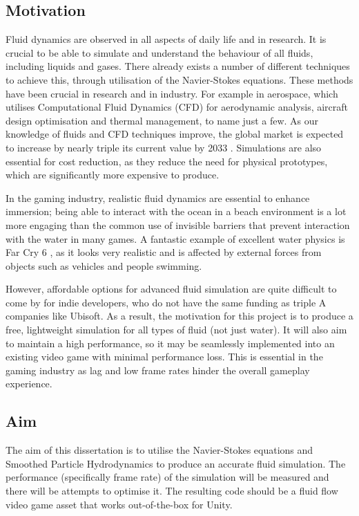 \documentclass[12pt]{article}
\begin{document}
    \subsection{Motivation}
    Fluid dynamics are observed in all aspects of daily life and in research. It is crucial to be able to simulate and understand the behaviour of all fluids, including liquids and gases. There already exists a number of different techniques to achieve this, through utilisation of the Navier-Stokes equations. These methods have been crucial in research and in industry. For example in aerospace, which utilises Computational Fluid Dynamics (CFD) for aerodynamic analysis, aircraft design optimisation and thermal management, to name just a few. As our knowledge of fluids and CFD techniques improve, the global market is expected to increase by nearly triple its current value by 2033 \cite{market}. Simulations are also essential for cost reduction, as they reduce the need for physical prototypes, which are significantly more expensive to produce.

    In the gaming industry, realistic fluid dynamics are essential to enhance immersion; being able to interact with the ocean in a beach environment is a lot more engaging than the common use of invisible barriers that prevent interaction with the water in many games. A fantastic example of excellent water physics is Far Cry 6 \cite{farcry6}, as it looks very realistic and is affected by external forces from objects such as vehicles and people swimming.
    
    However, affordable options for advanced fluid simulation are quite difficult to come by for indie developers, who do not have the same funding as triple A companies like Ubisoft. As a result, the motivation for this project is to produce a free, lightweight simulation for all types of fluid (not just water). It will also aim to maintain a high performance, so it may be seamlessly implemented into an existing video game with minimal performance loss. This is essential in the gaming industry as lag and low frame rates hinder the overall gameplay experience.

    \subsection{Aim}
    The aim of this dissertation is to utilise the Navier-Stokes equations and Smoothed Particle Hydrodynamics to produce an accurate fluid simulation. The performance (specifically frame rate) of the simulation will be measured and there will be attempts to optimise it. The resulting code should be a fluid flow video game asset that works out-of-the-box for Unity.
\end{document}
